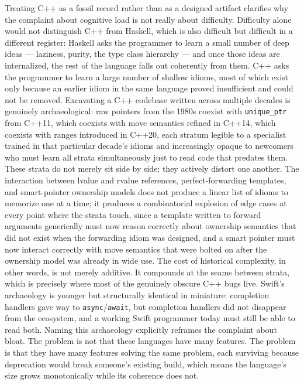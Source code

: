 \documentclass[11pt]{article}
\begin{document}
Treating C++ as a fossil record rather than as a designed artifact clarifies why the complaint about cognitive load is not really about difficulty. Difficulty alone would not distinguish C++ from Haskell, which is also difficult but difficult in a different register: Haskell asks the programmer to learn a small number of deep ideas --- laziness, purity, the type class hierarchy --- and once those ideas are internalized, the rest of the language falls out coherently from them. C++ asks the programmer to learn a large number of shallow idioms, most of which exist only because an earlier idiom in the same language proved insufficient and could not be removed. Excavating a C++ codebase written across multiple decades is genuinely archaeological: raw pointers from the 1980s coexist with \texttt{unique\_ptr} from C++11, which coexists with move semantics refined in C++14, which coexists with ranges introduced in C++20, each stratum legible to a specialist trained in that particular decade's idioms and increasingly opaque to newcomers who must learn all strata simultaneously just to read code that predates them. These strata do not merely sit side by side; they actively distort one another. The interaction between lvalue and rvalue references, perfect-forwarding templates, and smart-pointer ownership models does not produce a linear list of idioms to memorize one at a time; it produces a combinatorial explosion of edge cases at every point where the strata touch, since a template written to forward arguments generically must now reason correctly about ownership semantics that did not exist when the forwarding idiom was designed, and a smart pointer must now interact correctly with move semantics that were bolted on after the ownership model was already in wide use. The cost of historical complexity, in other words, is not merely additive. It compounds at the seams between strata, which is precisely where most of the genuinely obscure C++ bugs live. Swift's archaeology is younger but structurally identical in miniature: completion handlers gave way to \texttt{async}/\texttt{await}, but completion handlers did not disappear from the ecosystem, and a working Swift programmer today must still be able to read both. Naming this archaeology explicitly reframes the complaint about bloat. The problem is not that these languages have many features. The problem is that they have many features solving the same problem, each surviving because deprecation would break someone's existing build, which means the language's size grows monotonically while its coherence does not.
\end{document}
